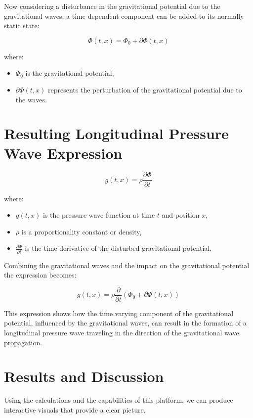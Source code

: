 \documentclass[12pt]{article}
\begin{document}
Now considering a disturbance in the gravitational potential due to the gravitational waves, a time dependent component can be added to its normally static state:

\[
\Phi(t, x) = \Phi_0 + \partial \Phi(t, x)
\]

where:

\begin{itemize}
    \item $\Phi_0$ is the gravitational potential,
    \item $\partial \Phi(t,x)$ represents the perturbation of the gravitational potential due to the waves.
\end{itemize}

\section*{Resulting Longitudinal Pressure Wave Expression}

\[
g(t, x) = \rho \frac{\partial \Phi}{\partial t}
\]

where:

\begin{itemize}
    \item $g(t,x)$ is the pressure wave function at time $t$ and position $x$,
    \item $\rho$ is a proportionality constant or density,
    \item $\frac{\partial \Phi}{\partial t}$ is the time derivative of the disturbed gravitational potential.
\end{itemize}

Combining the gravitational waves and the impact on the gravitational potential the expression becomes:

\[
g(t,x) = \rho \frac{\partial}{\partial t} \left( \Phi_0 + \partial \Phi(t,x) \right)
\]

This expression shows how the time varying component of the gravitational potential, influenced by the gravitational waves, can result in the formation of a longitudinal pressure wave traveling in the direction of the gravitational wave propagation.

\section*{Results and Discussion}

Using the calculations and the capabilities of this platform, we can produce interactive visuals that provide a clear picture.
\end{document}

